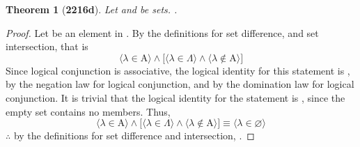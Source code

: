 \documentclass[preview]{standalone}
\newtheorem{theorem}{Theorem}
\begin{document}
\begin{theorem}[\textbf{2216d}]
    Let  and \bm{$\Lambda$} be sets. 
    .
\end{theorem}
\begin{proof}
    Let \bm{$\lambda$} be an element in 
    . 
    By the definitions for set difference, 
    and set intersection, that is
    \begin{equation*}
       \Big \langle \lambda \in \mathrm{A} \Big \rangle
            \land
        \bigg[
            \Big \langle \lambda \in \Lambda \Big \rangle
                \land
            \Big \langle \lambda \notin \mathrm{A} \Big \rangle
        \bigg] 
    \end{equation*}
    Since logical conjunction is associative, 
    the logical identity for this statement is \bm{$\bot$}, 
    by the negation law for logical conjunction, 
    and by the domination law for logical conjunction. 
    It is trivial that the logical identity for the statement
    \bm{$\lambda \in \varnothing$} is \bm{$\bot$}, 
    since the empty set contains no members. 
    Thus,
    \begin{equation*}
        \Big \langle \lambda \in \mathrm{A} \Big \rangle
             \land
         \bigg[
             \Big \langle \lambda \in \Lambda \Big \rangle
                 \land
             \Big \langle \lambda \notin \mathrm{A} \Big \rangle
         \bigg] 
            \equiv
        \Big \langle \lambda \in \varnothing \Big \rangle
     \end{equation*}
    $\therefore$ 
    by the definitions for set difference and intersection,
    .
\end{proof}
\end{document}
